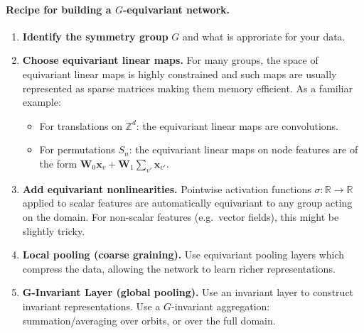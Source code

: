 \paragraph{Recipe for building a $G$-equivariant network.}
\begin{enumerate}
    \item \textbf{Identify the symmetry group} $G$ and what is approriate for your data.	
    \item \textbf{Choose equivariant linear maps.} For many groups, the space of equivariant linear maps is highly constrained and such maps are usually represented as sparse matrices making them memory efficient. As a familiar example:
    \begin{itemize}
        \item For translations on $\mathbb{Z}^d$: the equivariant linear maps are convolutions.
        \item For permutations $S_n$: the equivariant linear maps on node features are of the form $\mathbf{W}_0 \mathbf{x}_v + \mathbf{W}_1 \sum_{v'} \mathbf{x}_{v'}$.
    \end{itemize}

    \item \textbf{Add equivariant nonlinearities.} Pointwise activation functions
    $\sigma: \mathbb{R} \to \mathbb{R}$ applied to scalar features are automatically
    equivariant to any group acting on the domain. For non-scalar features (e.g.\ vector fields), this might be slightly tricky.
    \item \textbf{Local pooling (coarse graining).} Use equivariant pooling layers which compress the data, allowing the network to learn richer representations.
    \item \textbf{G-Invariant Layer (global pooling).} Use an invariant layer to construct invariant representations. Use a $G$-invariant aggregation: summation/averaging over orbits, or over the full domain.
\end{enumerate}

